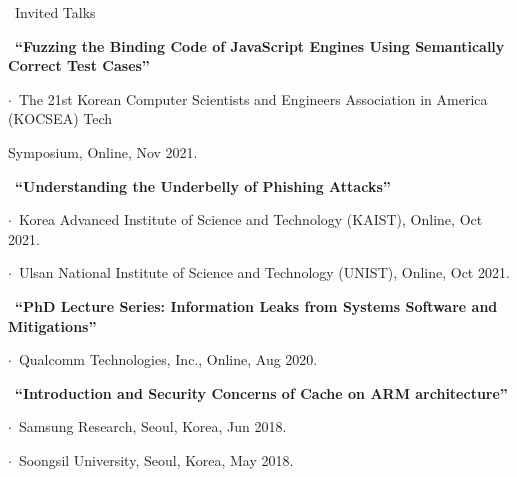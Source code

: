\documentclass{resume} %
\begin{document}


\begin{rSection}{\faGenderless~Invited Talks}

	\strut\textbullet~{\bf ``Fuzzing the Binding Code of JavaScript Engines Using Semantically Correct Test Cases''}\\
	\strut\hspace{1cm}$\cdot$~The 21st Korean Computer Scientists and Engineers Association in America (KOCSEA) Tech\\ \strut\hspace{1cm} Symposium, Online, Nov 2021.


	\strut\textbullet~{\bf ``Understanding the Underbelly of Phishing Attacks''}\\
	\strut\hspace{1cm}$\cdot$~Korea Advanced Institute of Science and Technology (KAIST), Online, Oct 2021.\\
	\strut\hspace{1cm}$\cdot$~Ulsan National Institute of Science and Technology (UNIST), Online, Oct 2021.

    \strut\textbullet~{\bf ``PhD Lecture Series: Information Leaks from Systems Software and Mitigations''}\\
    \strut\hspace{1cm}$\cdot$~Qualcomm Technologies, Inc., Online, Aug 2020.
	
    \strut\textbullet~{\bf ``Introduction and Security Concerns of Cache on ARM architecture''}\\
	\strut\hspace{1cm}$\cdot$~Samsung Research, Seoul, Korea, Jun 2018.\\
	\strut\hspace{1cm}$\cdot$~Soongsil University, Seoul, Korea, May 2018.

	\vspace{3mm}
\end{rSection}
\end{document}
